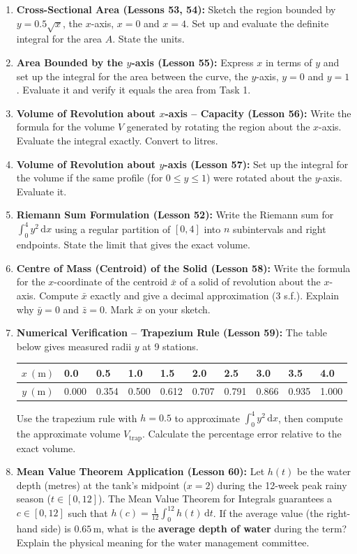 \documentclass[11pt]{article}
\begin{document}
\begin{enumerate}
    \item \textbf{Cross-Sectional Area (Lessons 53, 54):} Sketch the region bounded by $y=0.5\sqrt{x}$, the $x$-axis, $x=0$ and $x=4$. Set up and evaluate the definite integral for the area $A$. State the units.
    \item \textbf{Area Bounded by the $y$-axis (Lesson 55):} Express $x$ in terms of $y$ and set up the integral for the area between the curve, the $y$-axis, $y=0$ and $y=1$. Evaluate it and verify it equals the area from Task 1.
    \item \textbf{Volume of Revolution about $x$-axis -- Capacity (Lesson 56):} Write the formula for the volume $V$ generated by rotating the region about the $x$-axis. Evaluate the integral exactly. Convert to litres.
    \item \textbf{Volume of Revolution about $y$-axis (Lesson 57):} Set up the integral for the volume if the same profile (for $0\le y\le 1$) were rotated about the $y$-axis. Evaluate it.
    \item \textbf{Riemann Sum Formulation (Lesson 52):} Write the Riemann sum for $\int_0^4 y^2\,\mathrm{d}x$ using a regular partition of $[0,4]$ into $n$ subintervals and right endpoints. State the limit that gives the exact volume.
    \item \textbf{Centre of Mass (Centroid) of the Solid (Lesson 58):} Write the formula for the $x$-coordinate of the centroid $\bar{x}$ of a solid of revolution about the $x$-axis. Compute $\bar{x}$ exactly and give a decimal approximation (3 s.f.). Explain why $\bar{y}=0$ and $\bar{z}=0$. Mark $\bar{x}$ on your sketch.
    \item \textbf{Numerical Verification -- Trapezium Rule (Lesson 59):} The table below gives measured radii $y$ at 9 stations.
    \begin{center}
    \begin{tabularx}{\linewidth}{|c|*{9}{X|}}\hline
    \rowcolor{popblueL}
    $x\ (\mathrm{m})$ & 0.0 & 0.5 & 1.0 & 1.5 & 2.0 & 2.5 & 3.0 & 3.5 & 4.0 \\ \hline
    $y\ (\mathrm{m})$ & 0.000 & 0.354 & 0.500 & 0.612 & 0.707 & 0.791 & 0.866 & 0.935 & 1.000 \\ \hline
    \end{tabularx}
    \end{center}
    Use the trapezium rule with $h=0.5$ to approximate $\int_0^4 y^2\,\mathrm{d}x$, then compute the approximate volume $V_{\text{trap}}$. Calculate the percentage error relative to the exact volume.
    \item \textbf{Mean Value Theorem Application (Lesson 60):} Let $h(t)$ be the water depth (metres) at the tank's midpoint ($x=2$) during the 12-week peak rainy season ($t\in[0,12]$). The Mean Value Theorem for Integrals guarantees a $c\in[0,12]$ such that $h(c) = \frac{1}{12}\int_0^{12} h(t)\,\mathrm{d}t$. If the average value (the right-hand side) is $0.65\,\mathrm{m}$, what is the \textbf{average depth of water} during the term? Explain the physical meaning for the water management committee.
\end{enumerate}
\end{document}
